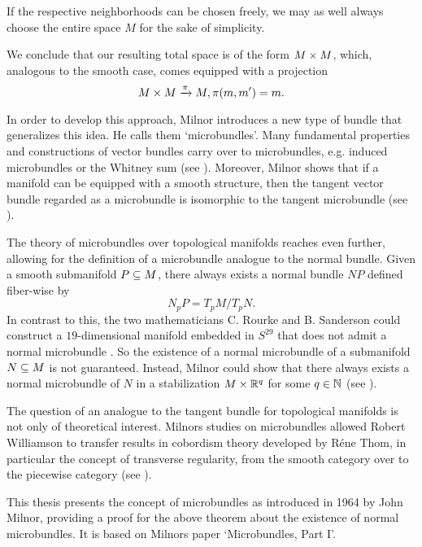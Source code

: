 \begin{myparagraph}
    If the respective neighborhoods can be chosen freely,
    we may as well always choose the entire space $M$ for the sake of simplicity.

    We conclude that our resulting total space is of the form $M \times M$, which,
    analogous to the smooth case, comes equipped with a projection
    \[ M \times M \xrightarrow{\pi} M, \pi(m, m') = m. \]
    
    In order to develop this approach, Milnor introduces a new type of bundle
    that generalizes this idea.
    He calls them `microbundles'.
    Many fundamental properties
    and constructions of vector bundles carry over to microbundles,
    e.g. induced microbundles or the Whitney sum (see ).
    Moreover, Milnor shows that if a manifold can be equipped with a smooth structure,
    then the tangent vector bundle regarded as a microbundle is isomorphic to the
    tangent microbundle (see ).

    The theory of microbundles over topological manifolds reaches even further,
    allowing for the definition of a microbundle analogue
    to the normal bundle.
    Given a smooth submanifold $P \subseteq{} M$,
    there always exists a normal bundle $NP$ defined fiber-wise by
    \[ N_p P = T_p M / T_p N. \]
    In contrast to this, the two mathematicians C. Rourke and B. Sanderson could construct a $19$-dimensional manifold
    embedded in $S^{29}$ that does not admit a normal microbundle \cite{rourke}.
    So the existence of a normal microbundle of a submanifold $N \subseteq{} M$ is not guaranteed.
    Instead, Milnor could show that there always exists a normal microbundle
    of $N$ in a stabilization $M \times \mathbb{R}^q$ for some $q \in \mathbb{N}$ (see ).

    The question of an analogue to the tangent bundle for
    topological manifolds is not only of theoretical interest.
    Milnors studies on microbundles allowed Robert Williamson
    to transfer results in cobordism theory developed by Réne Thom,
    in particular the concept of transverse regularity, from the smooth category
    over to the piecewise category (see \cite[§3]{williamson}).

    This thesis presents the concept of microbundles as introduced in 1964 by John Milnor,
    providing a proof for the above theorem about the existence of normal microbundles.
    It is based on Milnors paper `Microbundles, Part I'.
\end{myparagraph}